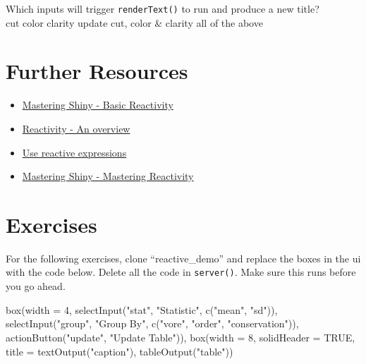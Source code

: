 \documentclass[
  oneside]{book}
\newenvironment{Shaded}{\begin{snugshade}}{\end{snugshade}}
\newcommand{\AttributeTok}[1]{\textcolor[rgb]{0.77,0.63,0.00}{#1}}
\newcommand{\ConstantTok}[1]{\textcolor[rgb]{0.00,0.00,0.00}{#1}}
\newcommand{\DecValTok}[1]{\textcolor[rgb]{0.00,0.00,0.81}{#1}}
\newcommand{\FunctionTok}[1]{\textcolor[rgb]{0.00,0.00,0.00}{#1}}
\newcommand{\NormalTok}[1]{#1}
\newcommand{\StringTok}[1]{\textcolor[rgb]{0.31,0.60,0.02}{#1}}
\providecommand{\tightlist}{%
  \setlength{\itemsep}{0pt}\setlength{\parskip}{0pt}}
\begin{document}
Which inputs will trigger \texttt{renderText}\texttt{()} to run and produce a new title?\\
cut color clarity update cut, color \& clarity all of the above

\hypertarget{resources-reactive}{%
\section{Further Resources}\label{resources-reactive}}

\begin{itemize}
\tightlist
\item
  \href{https://mastering-shiny.org/basic-reactivity.html}{Mastering Shiny - Basic Reactivity}
\item
  \href{https://shiny.rstudio.com/articles/reactivity-overview.html}{Reactivity - An overview}
\item
  \href{https://shiny.rstudio.com/tutorial/written-tutorial/lesson6/}{Use reactive expressions}
\item
  \href{https://mastering-shiny.org/reactivity-intro.html}{Mastering Shiny - Mastering Reactivity}
\end{itemize}

\hypertarget{exercises-reactive}{%
\section{Exercises}\label{exercises-reactive}}

For the following exercises, clone ``reactive\_demo'' and replace the boxes in the ui with the code below. Delete all the code in \texttt{server}\texttt{()}. Make sure this runs before you go ahead.

\begin{Shaded}
\begin{Highlighting}[]
\FunctionTok{box}\NormalTok{(}\AttributeTok{width =} \DecValTok{4}\NormalTok{,}
    \FunctionTok{selectInput}\NormalTok{(}\StringTok{"stat"}\NormalTok{, }\StringTok{"Statistic"}\NormalTok{, }\FunctionTok{c}\NormalTok{(}\StringTok{"mean"}\NormalTok{, }\StringTok{"sd"}\NormalTok{)),}
    \FunctionTok{selectInput}\NormalTok{(}\StringTok{"group"}\NormalTok{, }\StringTok{"Group By"}\NormalTok{, }\FunctionTok{c}\NormalTok{(}\StringTok{"vore"}\NormalTok{, }\StringTok{"order"}\NormalTok{, }\StringTok{"conservation"}\NormalTok{)),}
    \FunctionTok{actionButton}\NormalTok{(}\StringTok{"update"}\NormalTok{, }\StringTok{"Update Table"}\NormalTok{)),}
\FunctionTok{box}\NormalTok{(}\AttributeTok{width =} \DecValTok{8}\NormalTok{,}
    \AttributeTok{solidHeader =} \ConstantTok{TRUE}\NormalTok{,}
    \AttributeTok{title =} \FunctionTok{textOutput}\NormalTok{(}\StringTok{"caption"}\NormalTok{),}
    \FunctionTok{tableOutput}\NormalTok{(}\StringTok{"table"}\NormalTok{))}
\end{Highlighting}
\end{Shaded}
\end{document}
